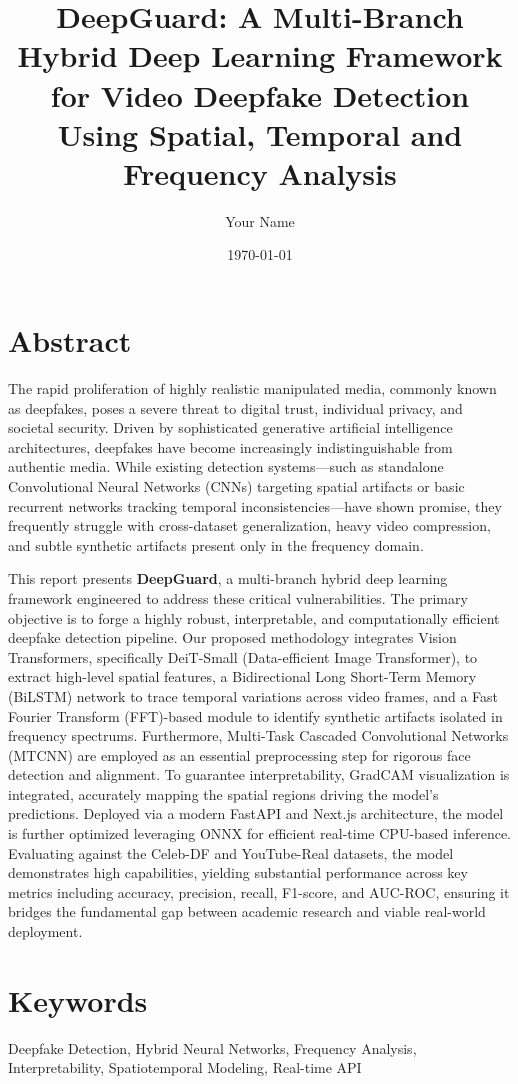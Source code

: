 \documentclass[12pt,a4paper]{article}
\title{DeepGuard: A Multi-Branch Hybrid Deep Learning Framework for Video Deepfake Detection Using Spatial, Temporal and Frequency Analysis}
\author{Your Name}
\date{\today}
\begin{document}
\maketitle
\section{Abstract}
The rapid proliferation of highly realistic manipulated media, commonly known as deepfakes, poses a severe threat to digital trust, individual privacy, and societal security. Driven by sophisticated generative artificial intelligence architectures, deepfakes have become increasingly indistinguishable from authentic media. While existing detection systems—such as standalone Convolutional Neural Networks (CNNs) targeting spatial artifacts or basic recurrent networks tracking temporal inconsistencies—have shown promise, they frequently struggle with cross-dataset generalization, heavy video compression, and subtle synthetic artifacts present only in the frequency domain.

This report presents \textbf{DeepGuard}, a multi-branch hybrid deep learning framework engineered to address these critical vulnerabilities. The primary objective is to forge a highly robust, interpretable, and computationally efficient deepfake detection pipeline. Our proposed methodology integrates Vision Transformers, specifically DeiT-Small (Data-efficient Image Transformer), to extract high-level spatial features, a Bidirectional Long Short-Term Memory (BiLSTM) network to trace temporal variations across video frames, and a Fast Fourier Transform (FFT)-based module to identify synthetic artifacts isolated in frequency spectrums. Furthermore, Multi-Task Cascaded Convolutional Networks (MTCNN) are employed as an essential preprocessing step for rigorous face detection and alignment. To guarantee interpretability, GradCAM visualization is integrated, accurately mapping the spatial regions driving the model’s predictions. Deployed via a modern FastAPI and Next.js architecture, the model is further optimized leveraging ONNX for efficient real-time CPU-based inference. Evaluating against the Celeb-DF and YouTube-Real datasets, the model demonstrates high capabilities, yielding substantial performance across key metrics including accuracy, precision, recall, F1-score, and AUC-ROC, ensuring it bridges the fundamental gap between academic research and viable real-world deployment.

\section{Keywords}
Deepfake Detection, Hybrid Neural Networks, Frequency Analysis, Interpretability, Spatiotemporal Modeling, Real-time API
\end{document}
